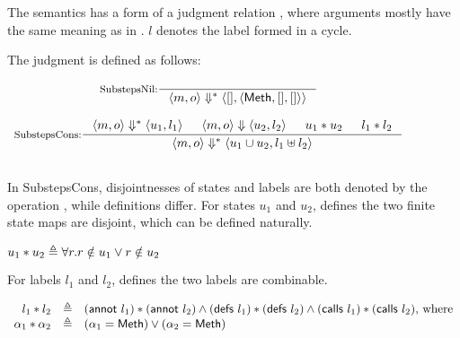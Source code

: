 The \Substeps{} semantics has a form of a judgment relation
, where arguments mostly have the same meaning as
in \Substep{}. $l$ denotes the label formed in a cycle.

\begin{definition}
  \label{def-semsss}
  The judgment  is defined as follows:
  \begin{center}
    \begin{math}
      \begin{array}{c}
        \inference[SubstepsNil:]{}
                  {\semsss{m}{o}{\emptymap}
                    {\semlbl{\alphameth}{\emptymap}{\emptymap}}} \\
        \mbox{} \\
        \inference[SubstepsCons:]{\semsss{m}{o}{u_1}{l_1} & \semsstepr{m}{o}{u_2}{l_2} & \sdisj{u_1}{u_2} & \ldisj{l_1}{l_2}}
                  {\semsss{m}{o}{\sunion{u_1}{u_2}}{\lplus{l_1}{l_2}}} \\
        \mbox{} \\
      \end{array}
    \end{math}
  \end{center}
\end{definition}

In SubstepsCons, disjointnesses of states and labels are both denoted
by the operation \sdisj{}{}, while definitions differ. For states
$u_1$ and $u_2$,  defines the two finite state maps
are disjoint, which can be defined naturally.

\begin{definition}
  \label{def-sdisj}
  \mbox{}
  \begin{center}
    \begin{math}
      u_1 \ast u_2 \triangleq \forall r. r \notin u_1 \vee r \notin u_2
    \end{math}
  \end{center}
\end{definition}

For labels $l_1$ and $l_2$,  defines the two labels
are combinable.

\begin{definition}
  \label{def-ldisj}
  \mbox{}
  \begin{center}
    \begin{math}
      \begin{array}{rcl}
        l_1 \ast l_2 & \triangleq &
        (\textsf{annot}\ l_1) \ast (\textsf{annot}\ l_2) \wedge
        (\textsf{defs}\ l_1) \ast (\textsf{defs}\ l_2) \wedge
        (\textsf{calls}\ l_1) \ast (\textsf{calls}\ l_2) \textrm{, where} \\
        \alpha_1 \ast \alpha_2 & \triangleq &
        (\alpha_1 = \textsf{Meth}) \vee (\alpha_2 = \textsf{Meth}) \\
      \end{array}
    \end{math}
  \end{center}
\end{definition}

